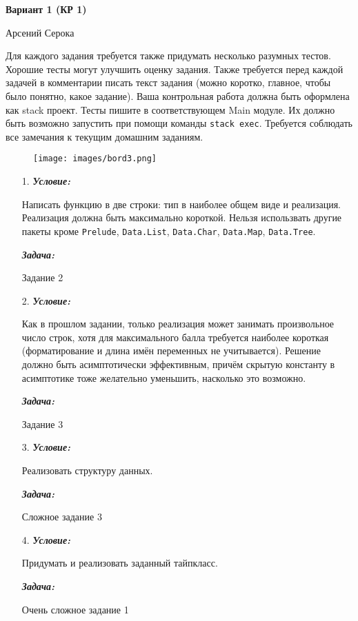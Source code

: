 \documentclass[11pt,a4paper]{article}
\begin{document}
%
%

\begin{center}
  \textbf{\LARGE{Вариант 1 (КР 1)} \\}

  Арсений Серока
\end{center}

Для каждого задания требуется также придумать несколько разумных тестов. Хорошие тесты могут улучшить оценку задания. Также требуется перед каждой задачей в комментарии писать текст задания (можно коротко, главное, чтобы было понятно, какое задание). Ваша контрольная работа должна быть оформлена как stack проект. Тесты пишите в соответствующем Main модуле. Их должно быть возможно запустить при помощи команды \texttt{stack exec}. Требуется соблюдать все замечания к текущим домашним заданиям.

\begin{figure}[H]
  \centering
  \texttt{[image: images/bord3.png]}
\end{figure}

\begin{enumerate}
  \item[1.]
  \textbf{\textit{Условие:}}

Написать функцию в две строки: тип в наиболее общем виде и реализация. Реализация должна быть максимально короткой. Нельзя использвать другие пакеты кроме \texttt{Prelude}, \texttt{Data.List}, \texttt{Data.Char}, \texttt{Data.Map}, \texttt{Data.Tree}.

  \textbf{\textit{Задача:}}

Задание 2
  \item[2.]
  \textbf{\textit{Условие:}}

Как в прошлом задании, только реализация может занимать произвольное число строк, хотя для максимального балла требуется наиболее короткая (форматирование и длина имён переменных не учитывается). Решение должно быть асимптотически эффективным, причём скрытую константу в асимптотике тоже желательно уменьшить, насколько это возможно.

  \textbf{\textit{Задача:}}

Задание 3
  \item[3.]
  \textbf{\textit{Условие:}}

Реализовать структуру данных.

  \textbf{\textit{Задача:}}

Сложное задание 3
  \item[4.]
  \textbf{\textit{Условие:}}

Придумать и реализовать заданный тайпкласс.

  \textbf{\textit{Задача:}}

Очень сложное задание 1
\end{enumerate}
\end{document}
